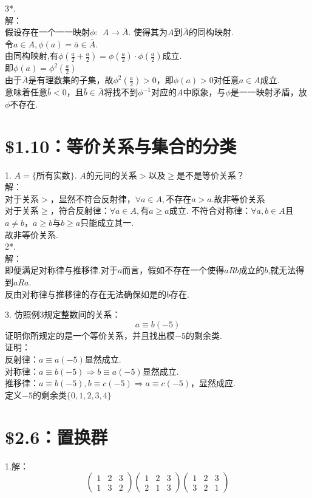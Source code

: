 \documentclass{ctexart}
\begin{document}
3*.\\
解：\\
假设存在一个一一映射$\phi: \ \ A \rightarrow \bar{A}$. 使得其为$A$到$\bar{A}$的同构映射. \\
令$a \in A, \phi(a)=\bar{a} \in \bar{A}$. \\
由同构映射,有$\phi(\frac{a}{2}+\frac{a}{2})=\phi(\frac{a}{2})\cdot \phi(\frac{a}{2})$成立. \\
即$\phi(a)=\phi^2(\frac{a}{2})$ \\
由于$\bar{A}$是有理数集的子集，故$\phi^2(\frac{a}{2})>0$，即$\phi(a)>0$对任意$a \in A$成立. \\
意味着任意$\bar{b}<0$，且$\bar{b} \in \bar{A}$将找不到$\phi^{-1}$对应的$A$中原象，与$\phi$是一一映射矛盾，放$\phi$不存在.
\section*{\$1.10：等价关系与集合的分类}
1. $A=\{$所有实数$\}$. $A$的元间的关系$>$以及$\geq$是不是等价关系？ \\
解：\\
对于关系$>$，显然不符合反射律，$ \forall a \in A, $不存在$ a>a $.故非等价关系
\\
对于关系$\geq$，符合反射律：$ \forall a \in A, $有$a \geq a$成立. 
不符合对称律：$\forall a,b \in A$且$a \neq b$，$a \geq b$与$b \geq a$只能成立其一.\\
故非等价关系.\\

2*. \\
解：\\
即便满足对称律与推移律.对于$a$而言，假如不存在一个使得$aRb$成立的$b$,就无法得到$aRa$.\\
反由对称律与推移律的存在无法确保如是的$b$存在.

3. 仿照例3规定整数间的关系：
\begin{equation*}
	a \equiv b (-5)
\end{equation*}
证明你所规定的是一个等价关系，并且找出模$-5$的剩余类.\\
证明： \\
反射律：$a \equiv a(-5)$显然成立. \\
对称律：$a \equiv b(-5) \Rightarrow b \equiv a(-5)$显然成立. \\
推移律：$a \equiv b(-5), b \equiv c(-5) \Rightarrow a \equiv c(-5)$，显然成应.\\
定义$-5$的剩余类$\{0,1,2,3,4\}$


\section*{\$2.6：置换群}
1.解：\\
$$
\left (\begin{array}{cccc}
	1 &2 & 3 \\
	1 &3 & 2  
\end{array}\right)
\left (\begin{array}{cccc}
	1 &2 & 3 \\
	2 &1 & 3  
\end{array}\right)
\left (\begin{array}{cccc}
	1 &2 & 3 \\
	3 &2 & 1  
\end{array}\right)
$$
\end{document}
